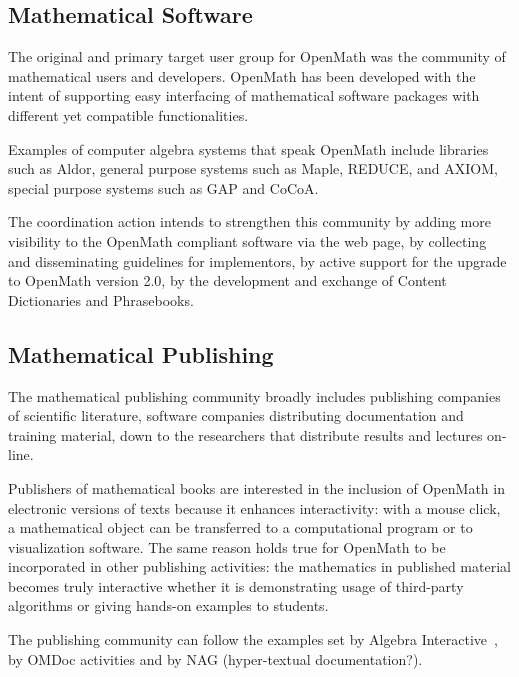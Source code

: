 \documentclass[draft]{artikel3}
\begin{document}
\subsection{Mathematical Software}
\label{sec:msw}

The original and primary target user group for OpenMath was the
community of mathematical users and developers. OpenMath has been
developed with the intent of supporting easy interfacing of
mathematical software packages with different yet compatible
functionalities.

Examples of computer algebra systems that speak OpenMath include
libraries such as Aldor, general purpose systems such as Maple,
REDUCE, and AXIOM, special purpose systems such as GAP and CoCoA.

The coordination action intends to strengthen this community by adding
more visibility to the OpenMath compliant software via the web page,
by collecting and disseminating guidelines for implementors, by active
support for the upgrade to OpenMath version 2.0, by the development
and exchange of Content Dictionaries and Phrasebooks.

\subsection{Mathematical Publishing}
\label{sec:mpubl}

The mathematical publishing community broadly includes publishing
companies of scientific literature, software companies distributing
documentation and training material, down to the researchers that
distribute results and lectures on-line.

Publishers of mathematical books are interested in the inclusion of
OpenMath in electronic versions of texts because it enhances
interactivity: with a mouse click, a mathematical object can be
transferred to a computational program or to visualization software.
The same reason holds true for OpenMath to be incorporated in other
publishing activities: the mathematics in published material becomes
truly interactive whether it is demonstrating usage of third-party
algorithms or giving hands-on examples to students.

The publishing community can follow the examples set by Algebra
Interactive~\cite{ida}, by OMDoc activities\cite{OMDOC} and by NAG
(hyper-textual documentation?).
\end{document}
